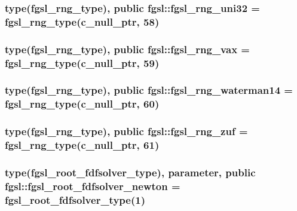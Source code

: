 \hypertarget{classfgsl_a762bd46602bef4b69b29c76cbb184687}{
\subsubsection[{fgsl\-\_\-rng\-\_\-uni32}]{\setlength{\rightskip}{0pt plus 5cm}type({\bf fgsl\-\_\-rng\-\_\-type}), public fgsl\-::fgsl\-\_\-rng\-\_\-uni32 = {\bf fgsl\-\_\-rng\-\_\-type}(c\-\_\-null\-\_\-ptr, 58)}}\label{classfgsl_a762bd46602bef4b69b29c76cbb184687}
\hypertarget{classfgsl_a85a32537847b642a47c056213ad0c1a6}{
\subsubsection[{fgsl\-\_\-rng\-\_\-vax}]{\setlength{\rightskip}{0pt plus 5cm}type({\bf fgsl\-\_\-rng\-\_\-type}), public fgsl\-::fgsl\-\_\-rng\-\_\-vax = {\bf fgsl\-\_\-rng\-\_\-type}(c\-\_\-null\-\_\-ptr, 59)}}\label{classfgsl_a85a32537847b642a47c056213ad0c1a6}
\hypertarget{classfgsl_a47b92bfccacd568a2f9c08efbc2cb660}{
\subsubsection[{fgsl\-\_\-rng\-\_\-waterman14}]{\setlength{\rightskip}{0pt plus 5cm}type({\bf fgsl\-\_\-rng\-\_\-type}), public fgsl\-::fgsl\-\_\-rng\-\_\-waterman14 = {\bf fgsl\-\_\-rng\-\_\-type}(c\-\_\-null\-\_\-ptr, 60)}}\label{classfgsl_a47b92bfccacd568a2f9c08efbc2cb660}
\hypertarget{classfgsl_a43051f5642335d5741ab956a7c9cdb64}{
\subsubsection[{fgsl\-\_\-rng\-\_\-zuf}]{\setlength{\rightskip}{0pt plus 5cm}type({\bf fgsl\-\_\-rng\-\_\-type}), public fgsl\-::fgsl\-\_\-rng\-\_\-zuf = {\bf fgsl\-\_\-rng\-\_\-type}(c\-\_\-null\-\_\-ptr, 61)}}\label{classfgsl_a43051f5642335d5741ab956a7c9cdb64}
\hypertarget{classfgsl_aa05053ddddf728c909cfa5bed48b65dc}{
\subsubsection[{fgsl\-\_\-root\-\_\-fdfsolver\-\_\-newton}]{\setlength{\rightskip}{0pt plus 5cm}type({\bf fgsl\-\_\-root\-\_\-fdfsolver\-\_\-type}), parameter, public fgsl\-::fgsl\-\_\-root\-\_\-fdfsolver\-\_\-newton = {\bf fgsl\-\_\-root\-\_\-fdfsolver\-\_\-type}(1)}}\label{classfgsl_aa05053ddddf728c909cfa5bed48b65dc}
